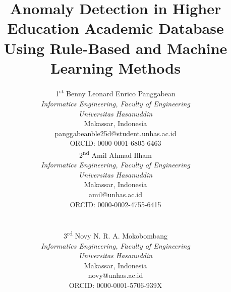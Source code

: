 \documentclass[conference]{IEEEtran}
\newif\ifblind
\begin{document}
\title{Anomaly Detection in Higher Education Academic Database Using Rule-Based and Machine Learning Methods}

\ifblind
\author{\IEEEauthorblockN{Anonymous Authors}
\IEEEauthorblockA{\textit{Anonymous Institution}\\
Anonymous City, Country}}
\else
\author{\parbox{\textwidth}{\centering
\parbox[t]{0.45\textwidth}{\centering
{\normalsize 1\textsuperscript{st} Benny Leonard Enrico Panggabean}\\
{\small \textit{Informatics Engineering, Faculty of Engineering} \\
\textit{Universitas Hasanuddin}\\
Makassar, Indonesia \\
panggabeanble25d@student.unhas.ac.id \\
ORCID: 0000-0001-6805-6463}}\hfill
\parbox[t]{0.45\textwidth}{\centering
{\normalsize 2\textsuperscript{nd} Amil Ahmad Ilham}\\
{\small \textit{Informatics Engineering, Faculty of Engineering} \\
\textit{Universitas Hasanuddin}\\
Makassar, Indonesia \\
amil@unhas.ac.id \\
ORCID: 0000-0002-4755-6415}}\\[2ex]
\parbox[t]{0.45\textwidth}{\centering
{\normalsize 3\textsuperscript{rd} Novy N. R. A. Mokobombang}\\
{\small \textit{Informatics Engineering, Faculty of Engineering} \\
\textit{Universitas Hasanuddin}\\
Makassar, Indonesia \\
novy@unhas.ac.id \\
ORCID: 0000-0001-5706-939X}}
}}
\fi

\maketitle
\end{document}

